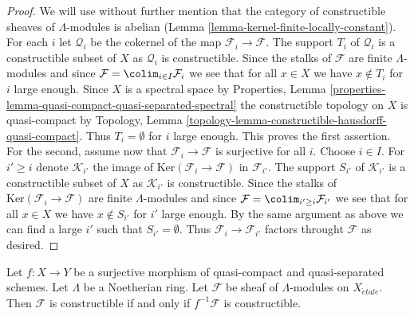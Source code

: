 \begin{proof}
We will use without further mention that the category of
constructible sheaves of $\Lambda$-modules is abelian
(Lemma \ref{lemma-kernel-finite-locally-constant}).
For each $i$ let $\mathcal{Q}_i$ be the cokernel of the map
$\mathcal{F}_i \to \mathcal{F}$. The support $T_i$ of $\mathcal{Q}_i$
is a constructible subset of $X$ as $\mathcal{Q}_i$ is constructible.
Since the stalks of $\mathcal{F}$ are finite $\Lambda$-modules
and since $\mathcal{F} = \colim_{i \in I} \mathcal{F}_i$ we see
that for all $x \in X$ we have $x \not \in T_i$ for $i$ large enough.
Since $X$ is a spectral space by Properties, Lemma
\ref{properties-lemma-quasi-compact-quasi-separated-spectral}
the constructible topology on $X$ is quasi-compact by
Topology, Lemma \ref{topology-lemma-constructible-hausdorff-quasi-compact}.
Thus $T_i = \emptyset$ for $i$ large enough. This proves the first
assertion. For the second, assume now that
$\mathcal{F}_i \to \mathcal{F}$ is surjective for all $i$.
Choose $i \in I$. For $i' \geq i$ denote $\mathcal{K}_{i'}$ the
image of $\text{Ker}(\mathcal{F}_i \to \mathcal{F})$ in $\mathcal{F}_{i'}$.
The support $S_{i'}$ of $\mathcal{K}_{i'}$
is a constructible subset of $X$ as $\mathcal{K}_{i'}$ is constructible.
Since the stalks of $\text{Ker}(\mathcal{F}_i \to \mathcal{F})$
are finite $\Lambda$-modules and since
$\mathcal{F} = \colim_{i' \geq i} \mathcal{F}_{i'}$ we see
that for all $x \in X$ we have $x \not \in S_{i'}$ for $i'$ large enough.
By the same argument as above we can find a large $i'$ such
that $S_{i'} = \emptyset$. Thus $\mathcal{F}_i \to \mathcal{F}_{i'}$
factors throught $\mathcal{F}$ as desired.
\end{proof}

\begin{lemma}
\label{lemma-check-constructible}
Let $f : X \to Y$ be a surjective morphism of quasi-compact and
quasi-separated schemes. Let $\Lambda$ be a Noetherian ring.
Let $\mathcal{F}$ be sheaf of $\Lambda$-modules on $X_{\acute{e}tale}$.
Then $\mathcal{F}$ is constructible if and only if $f^{-1}\mathcal{F}$
is constructible.
\end{lemma}

